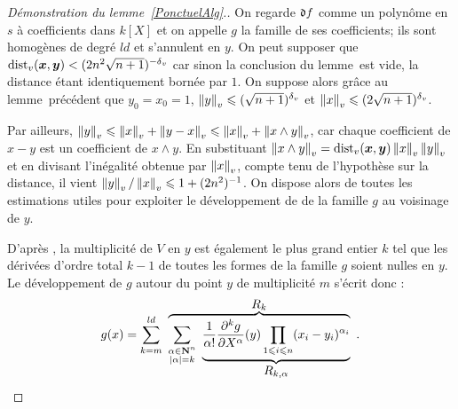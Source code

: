 \documentclass[11pt, twoside, a4paper]{article}
\theoremstyle{remark}
\begin{document}
\begin{proof}[Démonstration du lemme~\ref{PonctuelAlg}.]
 On regarde $\mathfrak{d} f$ comme un polynôme en $s$ à coefficients dans $k[X]$ et on appelle $g$ la famille de ses coefficients; ils sont homogènes de degré $ld$ et s'annulent en $y$. On peut supposer que $\mathrm{dist}_v(\boldsymbol{x}, \boldsymbol{y}) < (2n^2\sqrt{n+1})^{-{\delta\smash{_v}}}$ car sinon la conclusion du lemme~est vide, la distance étant identiquement bornée par $1$. On suppose alors grâce au lemme~précédent que $y_0 = x_0 = 1$, $\left\lVert y\right\rVert_{v} \leqslant (\sqrt{n+1})^{\delta\smash{_v}}$ et $\left\lVert x\right\rVert_{v} \leqslant (2 \sqrt{n+1})^{\delta\smash{_v}}$.

 Par ailleurs, $\left\lVert y\right\rVert_{v} \leqslant \left\lVert x\right\rVert_{v} + \left\lVert y-x\right\rVert_{v} \leqslant \left\lVert x\right\rVert_{v} + \left\lVert x \wedge y\right\rVert_{v}$, car chaque coefficient de $x - y$ est un coefficient de $x \wedge y$. En substituant $\left\lVert x \wedge y\right\rVert_{v} = \mathrm{dist}_v(\boldsymbol{x}, \boldsymbol{y}) \left\lVert x\right\rVert_{v} \left\lVert y\right\rVert_{v}$ et en divisant l'inégalité obtenue par $\left\lVert x\right\rVert_{v}$, compte tenu de l'hypothèse sur la distance, il vient $\left\lVert y\right\rVert_{v} / \left\lVert x\right\rVert_{v} \leqslant 1 + (2n^2)^{-1}$. On dispose alors de toutes les estimations utiles pour exploiter le développement de  de la famille $g$ au voisinage de $y$.

  D'après \cite[prop.~3]{phi2}, la multiplicité de $V$ en $y$ est également le plus grand entier $k$ tel que les dérivées d'ordre total $k-1$ de toutes les formes de la famille $g$ soient nulles en $y$. Le développement de $g$ autour du point $y$ de multiplicité $m$ s'écrit donc :
 \[
  g(x) = \sum_{k=m}^{ld} \ \overbrace{\sum_{\substack{\alpha \in \N^n \\ \lgr\alpha = k}}\ \underbrace{\frac 1{\alpha!} \frac{\partial^k g}{\partial X^\alpha} (y) \prod_{1 \le i \le n} (x_i - y_i)^{\alpha_i}}_{\textstyle R_{k, \alpha}}}^{\textstyle R_k} \pmm.
 \]


\end{proof}
\end{document}
